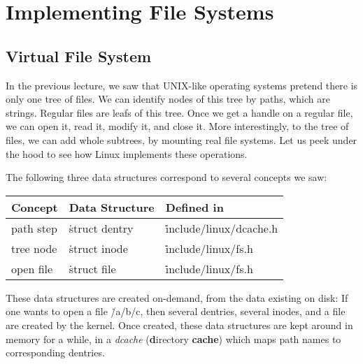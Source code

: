 \chapter{Implementing File Systems}\label{ch:05-file-impl}

\section{Virtual File System}

In the previous lecture,
  we saw that UNIX-like operating systems pretend there is only one tree of files.
We can identify nodes of this tree by paths, which are strings.
Regular files are leafs of this tree.
Once we get a handle on a regular file,
  we can open it, read it, modify it, and close it.
More interestingly, to the tree of files,
  we can add whole subtrees, by mounting real file systems.
Let us peek under the hood to see how Linux implements these operations.

The following three data structures correspond to several concepts we saw:
\begin{center}
\begin{tabular}{@{}lll@{}}
\toprule
Concept & Data Structure & Defined in \\
\midrule
path step & \.{struct dentry} & \.{include/linux/dcache.h} \\
tree node & \.{struct inode} & \.{include/linux/fs.h} \\
open file & \.{struct file} & \.{include/linux/fs.h} \\
\bottomrule
\end{tabular}
\end{center}
These data structures are created on-demand, from the data existing on disk:
If one wants to open a file \.{/a/b/c},
  then several dentries, several inodes, and a file are created by the kernel.
Once created, these data structures are kept around in memory for a while,
  in a \emph{dcache} ({\bf d}irectory {\bf cache})
    which maps path names to corresponding dentries.

